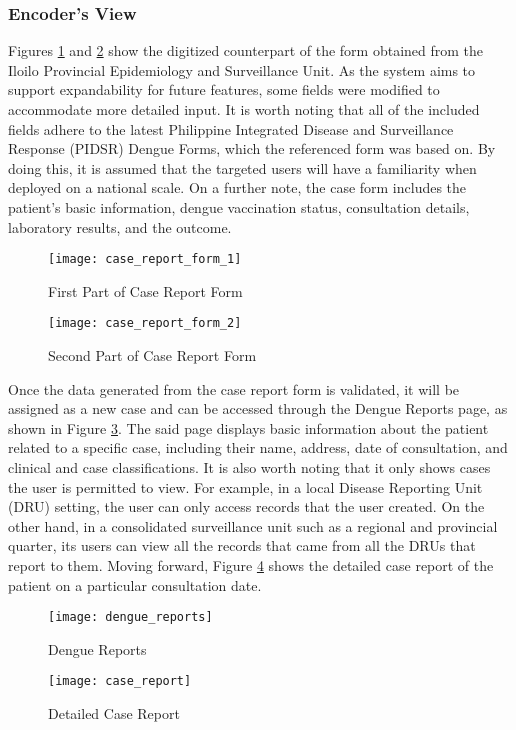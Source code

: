 \subsubsection{Encoder's View}
Figures \ref{fig:case_report_form_1} and \ref{fig:case_report_form_2} show the digitized counterpart of the form obtained from the Iloilo Provincial Epidemiology and Surveillance Unit. As the system aims to support expandability for future features, some fields were modified to accommodate more detailed input. It is worth noting that all of the included fields adhere to the latest Philippine Integrated Disease and Surveillance Response (PIDSR) Dengue Forms, which the referenced form was based on. By doing this, it is assumed that the targeted users will have a familiarity when deployed on a national scale. On a further note, the case form includes the patient's basic information, dengue vaccination status, consultation details, laboratory results, and the outcome. 
\begin{figure}[H]
	\centering
	\texttt{[image: case\_report\_form\_1]}
	\caption{First Part of Case Report Form}
	\label{fig:case_report_form_1}
\end{figure}
\begin{figure}[H]
	\centering
	\texttt{[image: case\_report\_form\_2]}
	\caption{Second Part of Case Report Form}
	\label{fig:case_report_form_2}
\end{figure}
\clearpage
Once the data generated from the case report form is validated, it will be assigned as a new case and can be accessed through the Dengue Reports page, as shown in Figure \ref{fig:dengue_reports}. The said page displays basic information about the patient related to a specific case, including their name, address, date of consultation, and clinical and case classifications. 
It is also worth noting that it only shows cases the user is permitted to view. For example, in a local Disease Reporting Unit (DRU) setting, the user can only access records that the user created. On the other hand, in a consolidated surveillance unit such as a regional and provincial quarter, its users can view all the records that came from all the DRUs that report to them. Moving forward, Figure \ref{fig:case_report} shows the detailed case report of the patient on a particular consultation date. 
\begin{figure}[H]
	\centering
	\texttt{[image: dengue\_reports]}
	\caption{Dengue Reports}
	\label{fig:dengue_reports}
\end{figure}
\begin{figure}[H]
	\centering
	\texttt{[image: case\_report]}
	\caption{Detailed Case Report}
	\label{fig:case_report}
\end{figure}
